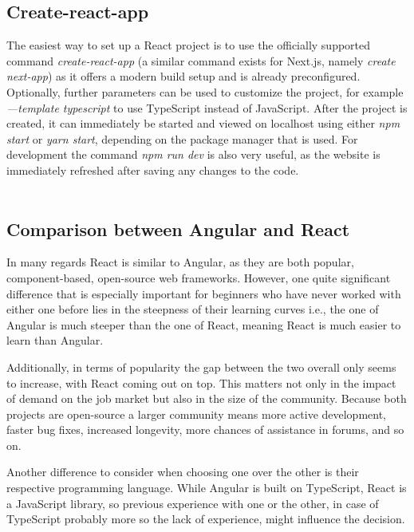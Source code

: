 \subsection{Create-react-app}
The easiest way to set up a React project is to use the officially supported command \emph{create-react-app}
(a similar command exists for Next.js, namely \emph{create next-app}) as it offers a modern build setup and is already preconfigured. 
Optionally, further parameters can be used to customize the project, for example \emph{—template typescript} to use TypeScript 
instead of JavaScript. After the project is created, it can immediately be started and viewed on localhost using either 
\emph{npm start} or \emph{yarn start}, depending on the package manager that is used. For development the command \emph{npm run dev} is 
also very useful, as the website is immediately refreshed after saving any changes to the code. \cite{create-react}
\\
\\
\subsection{Comparison between Angular and React}
In many regards React is similar to Angular, as they are both popular, component-based, open-source web frameworks. However, one 
quite significant difference that is especially important for beginners who have never worked with either one before lies in the 
steepness of their learning curves i.e., the one of Angular is much steeper than the one of React, meaning React is much easier 
to learn than Angular.

Additionally, in terms of popularity the gap between the two overall only seems to increase, with React coming out on top. This 
matters not only in the impact of demand on the job market but also in the size of the community. Because both projects are 
open-source a larger community means more active development, faster bug fixes, increased longevity, more chances of assistance 
in forums, and so on.

Another difference to consider when choosing one over the other is their respective programming language. While Angular is built
on TypeScript, React is a JavaScript library, so previous experience with one or the other, in case of TypeScript probably
more so the lack of experience, might influence the decision.

